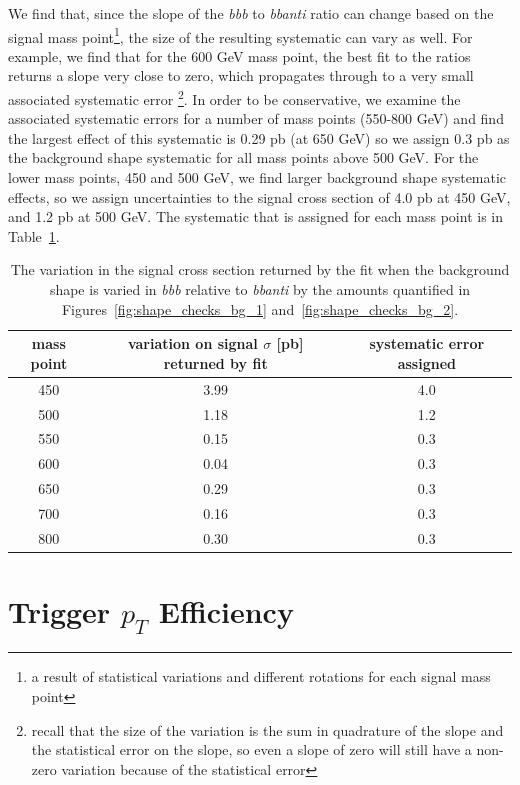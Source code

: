 We find that, since the slope of the \textit{bbb} to \textit{bbanti} ratio can change
based on the signal mass point\footnote{a result of statistical variations and different
rotations for each signal mass point}, the size of the resulting systematic can vary as well.
For example, we find that for the 600 GeV mass point, the best fit to the ratios returns a 
slope very close to zero, which propagates through to a very small associated systematic error
\footnote{recall that the size of the variation is the sum in quadrature of the slope and the
statistical error on the slope, so even a slope of zero will still have a non-zero variation
because of the statistical error}.  In order to be conservative, we examine the 
associated systematic errors for a number of mass points (550-800 GeV) and find 
the largest effect of this systematic is 0.29 pb (at 650 GeV) so we assign 0.3 pb
as the background shape systematic for all mass points above 500 GeV.  For the lower mass
points, 450 and 500 GeV, we find larger background shape systematic effects, so 
we assign uncertainties to the signal cross section of 4.0 pb at 450 GeV, and 1.2 pb at 500 GeV. 
The systematic that is assigned for each mass point is in Table~\ref{tab:bkg_shape_syst}.

\begin{table}
    \center
    \caption{The variation in the signal cross section returned by the fit when the 
    background shape is varied in \textit{bbb} relative to \textit{bbanti} by the amounts
    quantified in Figures~\ref{fig:shape_checks_bg_1} and~\ref{fig:shape_checks_bg_2}.
    \label{tab:bkg_shape_syst}}
    \begin{tabular}{c c c} \hline \hline
        mass point & variation on signal $\sigma$ [pb] returned by fit  & systematic error assigned  \\ \hline
        450 & 3.99 & 4.0\\
        500 & 1.18 & 1.2\\
        550 & 0.15 & 0.3 \\
        600 & 0.04 & 0.3\\
        650 & 0.29 & 0.3\\
        700 & 0.16 & 0.3\\
        800 & 0.30 & 0.3\\
    \end{tabular}
\end{table}


 

\section{Trigger $p_T$ Efficiency}
\label{sec:trigger_syst}

